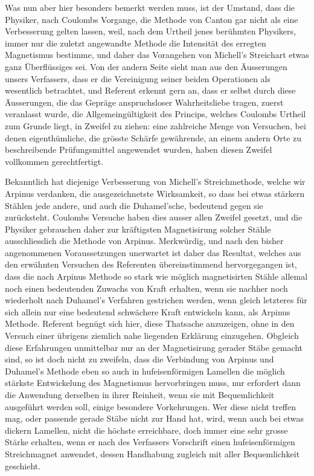 \documentclass[fontsize=10pt,paper=a5,pagesize=auto]{scrbook}
\newcommand{\origpage}[1]{\marginpar{\footnotesize\textit{S. #1}}}
\begin{document}
\origpage{594}
Was nun aber hier besonders bemerkt werden muss, ist der Umstand, dass die Physiker, nach Coulombs Vorgange, die Methode von Canton gar nicht als eine Verbesserung gelten lassen, weil, nach dem Urtheil jenes berühmten Physikers, immer nur die zuletzt angewandte Methode die Intensität des erregten Magnetismus bestimme, und daher das Vorangehen von Michell's Streichart etwas ganz Überflüssiges sei. Von der andern Seite sieht man aus den Äusserungen unsers Verfassers, dass er die Vereinigung seiner beiden Operationen als wesentlich betrachtet, und Referent erkennt gern an, dass er selbst durch diese Äusserungen, die das Gepräge anspruchsloser Wahrheitsliebe tragen, zuerst veranlasst wurde, die Allgemeingültigkeit des Princips, welches Coulombs Urtheil zum Grunde liegt, in Zweifel zu ziehen: eine zahlreiche Menge von Versuchen, bei denen eigenthümliche, die grösste Schärfe gewährende, an einem andern Orte zu beschreibende Prüfungsmittel angewendet wurden, haben diesen Zweifel vollkommen gerechtfertigt.

Bekanntlich hat diejenige Verbesserung von Michell's Streichmethode, welche wir Arpinus verdanken, die ausgezeichnetste Wirksamkeit, so dass bei etwas stärkern Stählen jede andere, und auch die Duhamel'sche, bedeutend gegen sie zurücksteht. Coulombs Versuche haben dies ausser allen Zweifel gesetzt, und die Physiker gebrauchen daher zur kräftigsten Magnetisirung solcher Stähle ausschliesslich die Methode von Arpinus. Merkwürdig, und nach den bisher angenommenen Voraussetzungen unerwartet ist daher das Resultat, welches aus den erwähnten Versuchen des Referenten übereinstimmend hervorgegangen ist, dass die nach Arpinus Methode so stark wie möglich magnetisirten Stähle allemal noch einen bedeutenden Zuwachs von Kraft erhalten, wenn sie nachher noch wiederholt nach Duhamel's Verfahren gestrichen werden, wenn gleich letzteres für sich allein nur eine bedeutend schwächere Kraft entwickeln kann, als Arpinus Methode. Referent begnügt sich hier, diese Thatsache anzuzeigen, ohne in den Versuch einer übrigens ziemlich nahe liegenden Erklärung einzugehen. Obgleich diese Erfahrungen unmittelbar nur an der Magnetisirung gerader Stäbe gemacht sind, so ist doch nicht zu zweifeln, dass die Verbindung von Arpinus und Duhamel's Methode eben so auch in hufeisenförmigen Lamellen die möglich stärkste Entwickelung des Magnetismus hervorbringen muss, nur erfordert dann die Anwendung derselben in ihrer Reinheit, wenn sie mit Bequemlichkeit ausgeführt werden soll, einige besondere Vorkehrungen. Wer diese nicht treffen mag, oder passende gerade Stäbe nicht zur Hand hat, wird, wenn auch bei etwas dickern Lamellen, nicht die höchste erreichbare, doch immer eine sehr grosse Stärke erhalten, wenn er nach des Verfassers Vorschrift einen hufeisenförmigen Streichmagnet anwendet, dessen Handhabung zugleich mit aller Bequemlichkeit geschieht.
\end{document}
